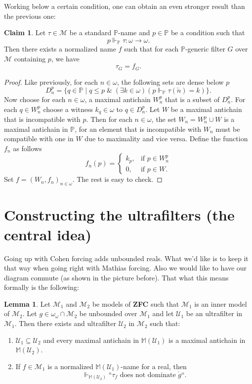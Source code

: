 \documentclass[12pt]{article}\usepackage[english]{babel}
\newcommand{\M}{\mathbb{M}}
\newcommand{\bbP}{\mathbb{P}}
\newcommand{\logand}{\; \& \;}
\newcommand{\calM}{\mathcal{M}}
\newcommand{\calU}{\mathcal{U}}
\theoremstyle{definition}
\newtheorem{claim}{Claim}
\newtheorem{lemma}{Lemma}
\theoremstyle{remark}
\begin{document}
Working below a certain condition, one can obtain an even stronger result than the previous one:
\begin{claim}
  Let $\tau \in \calM$ be a standard $\bbP$-name and $p \in \bbP$ be a condition such that
  \[
    p \Vdash_\bbP \tau : \omega \longrightarrow \omega.
  \]
  Then there exists a normalized name $f$ such that for each $\bbP$-generic filter $G$ over $\calM$ containing $p$, we have
  \[
    \tau_G = f_G.
  \]
\end{claim}

\begin{proof}
  Like previously, for each $n \in \omega$, the following sets are dense below $p$
  \[
    D^p_n = \{ q \in \bbP \mid q \leq p \logand (\exists k \in \omega)(p \Vdash_\bbP \tau(\check{n}) = k) \}.
  \]
  Now choose for each $n \in \omega$, a maximal antichain $W^p_n$ that is a subset of $D^p_n$.
  For each $q \in W^p_n$ choose a witness $k_q \in \omega$ to $q \in D^p_n$.
  Let $W$ be a maximal antichain that is incompatible with $p$.
  Then for each $n \in \omega$, the set $W_n = W^p_n \cup W$ is a maximal antichain in $\bbP$, for an element that is incompatible with $W_n$ must be compatible with one in $W$ due to maximality and vice versa.
  Define the function $f_n$ as follows
  \[
    f_n(p) = \begin{cases} 
               k_p, & \text{if } p \in W_n^p \\ 
               0,   & \text{if } p \in W.
             \end{cases}
  \]
  Set $f = (W_n, f_n)_{n \in \omega}$.
  The rest is easy to check.
\end{proof}

\newpage

\section*{Constructing the ultrafilters (the central idea)}

Going up with Cohen forcing adds unbounded reals.
What we'd like is to keep it that way when going right with Mathias forcing.
Also we would like to have our diagram commute (as shown in the picture before).
That what this means formally is the following:
\begin{lemma}
  Let $\calM_1$ and $\calM_2$ be models of \textbf{ZFC} such that $\calM_1$ is an inner model of $\calM_2$.
  Let $g \in \omega_\omega \cap \calM_2$ be unbounded over $\calM_1$ and let $\calU_1$ be an ultrafilter in $\calM_1$.
  Then there exists and ultrafilter $\calU_2$ in $\calM_2$ such that:
  \begin{enumerate}[(1)]
    \item $\calU_1 \subseteq \calU_2$ and every maximal antichain in $\M(\calU_1)$ is a maximal antichain in $\M(\calU_2)$.
    \item If $f \in \calM_1$ is a normalized $\M(\calU_1)$-name for a real, then
      \[
        \Vdash_{\M(\calU_2)} \text{``$\tau_f$ does not dominate $\mathring{g}$``}.
      \]
  \end{enumerate}
\end{lemma}
\end{document}
